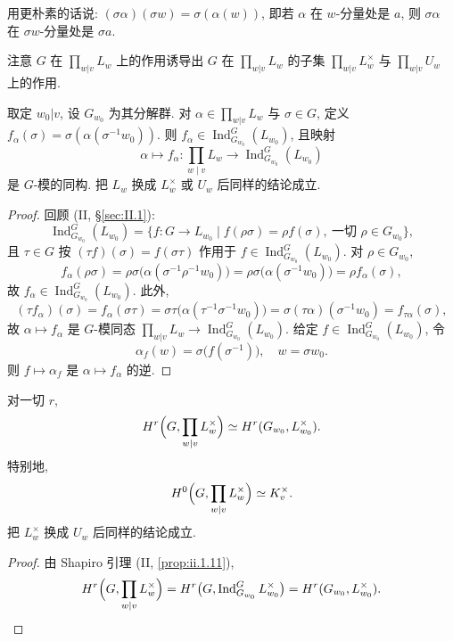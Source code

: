 用更朴素的话说: $(\sigma\alpha)(\sigma w)=\sigma(\alpha(w))$, 即若 $\alpha$ 在 $w$-分量处是 $a$, 则 $\sigma\alpha$ 在 $\sigma w$-分量处是 $\sigma a$.

注意 $G$ 在 $\prod_{w|v}L_w$ 上的作用诱导出 $G$ 在 $\prod_{w|v}L_w$ 的子集 $\prod_{w|v}L_w^{\times}$ 与 $\prod_{w|v}U_w$ 上的作用.

\begin{proposition}\label{prop:vii.2.2}
取定 $w_0|v$, 设 $G_{w_0}$ 为其分解群. 对 $\alpha\in\prod_{w|v}L_w$ 与 $\sigma\in G$, 定义 $f_{\alpha}(\sigma)=\sigma(\alpha(\sigma^{-1}w_{0}))$. 则 $f_{\alpha}\in\operatorname{Ind}_{G_{w_{0}}}^{G}(L_{w_{0}})$, 且映射
\[
\alpha\mapsto f_{\alpha}\colon\prod_{w\mid v}L_{w}\to\operatorname{Ind}_{G_{w_{0}}}^{G}(L_{w_{0}})
\]
是 $G$-模的同构. 把 $L_w$ 换成 $L_w^{\times}$ 或 $U_w$ 后同样的结论成立.
\end{proposition}

\begin{proof}
回顾 (II, \S \ref{sec:II.1}):
\[
\operatorname{Ind}_{G_{w_{0}}}^{G}(L_{w_{0}})=\{f:G\to L_{w_{0}}\mid f(\rho\sigma)=\rho f(\sigma),\ \text{一切 }\rho\in G_{w_{0}}\},
\]
且 $\tau\in G$ 按 $(\tau f)(\sigma)=f(\sigma\tau)$ 作用于 $f\in\operatorname{Ind}_{G_{w_{0}}}^{G}(L_{w_{0}})$. 对 $\rho\in G_{w_{0}}$,
\[
f_{\alpha}(\rho\sigma)=\rho\sigma\bigl(\alpha(\sigma^{-1}\rho^{-1}w_{0})\bigr)=\rho\sigma\bigl(\alpha(\sigma^{-1}w_{0})\bigr)=\rho f_{\alpha}(\sigma),
\]
故 $f_{\alpha}\in\operatorname{Ind}_{G_{w_{0}}}^{G}(L_{w_{0}})$. 此外,
\[
(\tau f_{\alpha})(\sigma)=f_{\alpha}(\sigma\tau)=\sigma\tau\bigl(\alpha(\tau^{-1}\sigma^{-1}w_{0})\bigr)=\sigma(\tau\alpha)(\sigma^{-1}w_{0})=f_{\tau\alpha}(\sigma),
\]
故 $\alpha\mapsto f_\alpha$ 是 $G$-模同态 $\prod_{w|v}L_w\to\operatorname{Ind}_{G_{w_{0}}}^{G}(L_{w_{0}})$. 给定 $f\in\operatorname{Ind}_{G_{w_{0}}}^{G}(L_{w_{0}})$, 令
\[
\alpha_{f}(w)=\sigma\bigl(f(\sigma^{-1})\bigr),\quad w=\sigma w_{0}.
\]
则 $f\mapsto\alpha_f$ 是 $\alpha\mapsto f_\alpha$ 的逆.
\end{proof}

\begin{proposition}\label{prop:vii.2.3}
对一切 $r$,
\[
H^{r}\Bigl(G,\prod_{w\mid v}L_{w}^{\times}\Bigr)\simeq H^{r}(G_{w_{0}},L_{w_{0}}^{\times}).
\]
特别地,
\[
H^{0}\Bigl(G,\prod_{w|v}L_{w}^{\times}\Bigr)\simeq K_{v}^{\times}.
\]
把 $L_w^{\times}$ 换成 $U_w$ 后同样的结论成立.
\end{proposition}

\begin{proof}
由 Shapiro 引理 (II, \ref{prop:ii.1.11}),
\[
H^{r}\Bigl(G,\prod_{w|v}L_{w}^{\times}\Bigr)=H^{r}\bigl(G,\operatorname{Ind}_{G_{w_{0}}}^{G}L_{w_{0}}^{\times}\bigr)=H^{r}(G_{w_{0}},L_{w_{0}}^{\times}).
\]
\end{proof}

